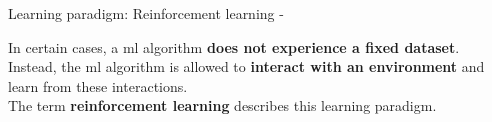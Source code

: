 %
%
%

\begin{frame}[t,allowframebreaks]{
    Learning paradigm: Reinforcement learning - }

    In certain cases, a \gls{ml} algorithm 
    {\bf does not experience a fixed dataset}.\\
    \vspace{0.2cm}
    Instead, the \gls{ml} algorithm is allowed to 
    {\bf interact with an environment} and learn from these interactions.\\
    \vspace{0.2cm}
    The term {\bf {}\gls{reinforcement learning}}
    describes this learning paradigm.\\

\end{frame}